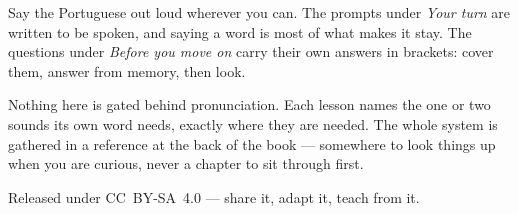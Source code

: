 \documentclass[11pt,twoside]{book}
\begin{document}
Say the Portuguese out loud wherever you can. The prompts under \emph{Your turn}
are written to be spoken, and saying a word is most of what makes it stay. The
questions under \emph{Before you move on} carry their own answers in brackets:
cover them, answer from memory, then look.

Nothing here is gated behind pronunciation. Each lesson names the one or two
sounds its own word needs, exactly where they are needed. The whole system is
gathered in a reference at the back of the book --- somewhere to look things up
when you are curious, never a chapter to sit through first.

Released under CC~BY-SA~4.0 --- share it, adapt it, teach from it.

\tableofcontents

\mainmatter






























\backmatter






\end{document}
